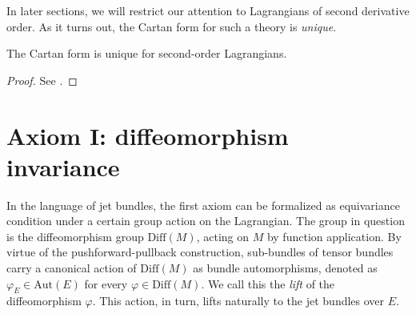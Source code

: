 In later sections, we will restrict our attention to Lagrangians of second derivative order. As it turns out, the Cartan form for such a theory is \emph{unique}.
\begin{proposition}\label{prop_cartan_unique}
  The Cartan form is unique for second-order Lagrangians.
\end{proposition}
\begin{proof}
  See \cite{Saunders_1989}.
\end{proof}

\section{Axiom I: diffeomorphism invariance}

In the language of jet bundles, the first axiom can be formalized as equivariance condition under a certain group action on the Lagrangian. The group in question is the diffeomorphism group $\mathrm{Diff}(M)$, acting on $M$ by function application. By virtue of the pushforward-pullback construction, sub-bundles of tensor bundles carry a canonical action of $\mathrm{Diff}(M)$ as bundle automorphisms, denoted as $\varphi_E\in \mathrm{Aut}(E)$ for every $\varphi\in\mathrm{Diff}(M)$. We call this the \emph{lift} of the diffeomorphism $\varphi$. This action, in turn, lifts naturally to the jet bundles over $E$.

